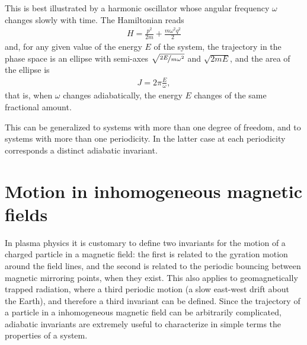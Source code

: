 This is best illustrated by a harmonic oscillator whose angular frequency $\omega$
changes slowly with time. The Hamiltonian reads
\begin{align*}
  H = \frac{p^2}{2m} + \frac{m\omega^2 q^2}{2}
\end{align*}
and, for any given value of the energy $E$ of the system, the trajectory in the
phase space is an ellipse with semi-axes $\sqrt{\nicefrac{2E}{m\omega^2}}$ and
$\sqrt{2mE}$, and the area of the ellipse is
\begin{align*}
  J = 2\pi \frac{E}{\omega},
\end{align*}
that is, when $\omega$ changes adiabatically, the energy $E$ changes of the same
fractional amount.

This can be generalized to systems with more than one degree of freedom, and to
systems with more than one periodicity. In the latter case at each periodicity
corresponds a distinct adiabatic invariant.


\section{Motion in inhomogeneous magnetic fields}

In plasma physics it is customary to define two invariants for the motion of a
charged particle in a magnetic field: the first is related to the gyration
motion around the field lines, and the second is related to the periodic bouncing
between magnetic mirroring points, when they exist. This also applies to geomagnetically
trapped radiation, where a third periodic motion (a slow east-west drift about
the Earth), and therefore a third invariant can be defined. Since the trajectory
of a particle in a inhomogeneous magnetic field can be arbitrarily complicated,
adiabatic invariants are extremely useful to characterize in simple terms the
properties of a system.

